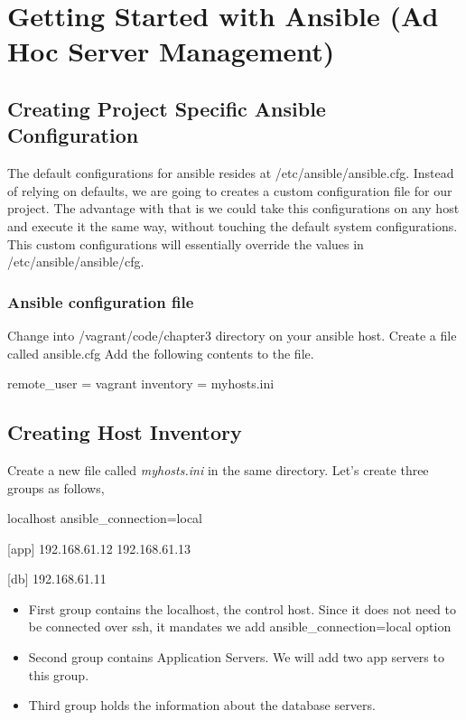 \chapter{Getting Started with Ansible (Ad Hoc Server Management)}

\section{Creating Project Specific Ansible Configuration}

The default configurations for ansible resides at /etc/ansible/ansible.cfg. Instead of relying on defaults, we are going to creates  a custom configuration file for our project. The advantage with that is we could take this configurations on any host and execute it the same way, without touching the default system configurations.  This custom configurations will essentially  override the values in /etc/ansible/ansible/cfg.

\subsection{Ansible configuration file}

Change into /vagrant/code/chapter3 directory on your ansible host. Create a file called ansible.cfg  Add  the following contents to the file.

\begin{code}
remote_user = vagrant
inventory   = myhosts.ini
\end{code}

\section{Creating Host Inventory}

Create a new file called \emph{myhosts.ini} in the same directory.\newline
Let's create three groups as follows,

\begin{code}
[local]
localhost ansible_connection=local

[app]
192.168.61.12
192.168.61.13

[db]
192.168.61.11
\end{code}

\begin{itemize}
\item First group contains the localhost, the control host. Since it does not need to be connected over ssh, it mandates we add ansible\_connection=local option
\item Second group contains  Application Servers. We will add  two app servers to this group.
\item Third group holds the information about the database servers.
\end{itemize}

